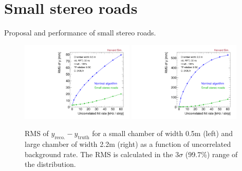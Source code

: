 \section{Small stereo roads}
\label{sec:stereoroads}

Proposal and performance of small stereo roads.

\begin{figure}[!htpb]
  \begin{center}
    \includegraphics[width=0.48\textwidth]{figures/rms_y_small_vs_rate.pdf}
    \includegraphics[width=0.48\textwidth]{figures/rms_y_large_vs_rate.pdf}
  \end{center}
  \vspace{-10pt}
  \caption{RMS of $y_\text{reco.} - y_\text{truth}$ for a small chamber of width 0.5m (left) and large chamber of width 2.2m (right) as a function of uncorrelated background rate. The RMS is calculated in the $3\sigma$ (99.7\%) range of the distribution.}
  \label{fig:rms_vs_rate}
\end{figure}

